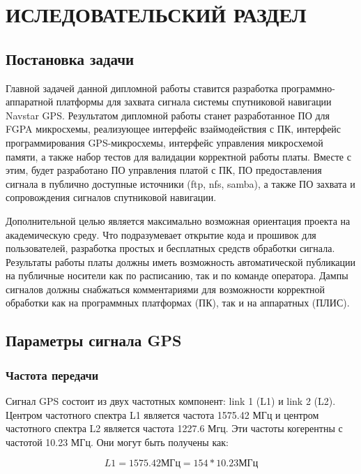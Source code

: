 \section{ИСЛЕДОВАТЕЛЬСКИЙ РАЗДЕЛ}

\subsection{Постановка задачи}
Главной задачей данной дипломной работы ставится разработка программно-аппаратной платформы для захвата сигнала системы спутниковой 
навигации Navstar GPS. Результатом дипломной работы станет разработанное ПО для FGPA микросхемы, реализующее интерфейс взаймодействия с ПК,
интерфейс программирования GPS-микросхемы, интерфейс управления микросхемой памяти, а также набор тестов для валидации корректной работы
платы. Вместе с этим, будет разработано ПО управления платой с ПК, ПО предоставления сигнала в публично доступные источники
(ftp, nfs, samba), а также ПО захвата и сопровождения сигналов спутниковой навигации. 

Дополнительной целью является максимально возможная ориентация проекта на академическую среду. Что подразумевает открытие кода и прошивок
для пользователей, разработка простых и бесплатных средств обработки сигнала. Результаты работы платы должны иметь возможность
автоматической публикации на публичные носители как по расписанию, так и по команде оператора. Дампы сигналов должны снабжаться
комментариями для возможности корректной обработки как на программных платформах (ПК), так и на аппаратных (ПЛИС).

\subsection{Параметры сигнала GPS}
\label{razdel11}
\subsubsection*{Частота передачи}
Сигнал GPS состоит из двух частотных компонент: link 1 (L1) и link 2 (L2). Центром частотного спектра L1 является
частота 1575.42 МГц и центром частотного спектра L2 является частота 1227.6 Мгц. Эти частоты когерентны с
частотой 10.23 МГц. Они могут быть получены как:

\begin{equation}
L1=1575.42\mbox{МГц}=154*10.23\mbox{МГц}
\label{eq:l1_freq}
\end{equation}

